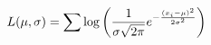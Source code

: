 \documentclass[preview]{standalone}
\begin{document}
\begin{align*}
\special{dvisvgm:raw <g id='unique000'>}L(\mu, \sigma) = \sum \log \left( \frac{1}{\sigma\sqrt{2\pi}} e^{-\frac{(x_i-\mu)^2}{2\sigma^2}} \right)\special{dvisvgm:raw </g>}
\end{align*}
\end{document}
